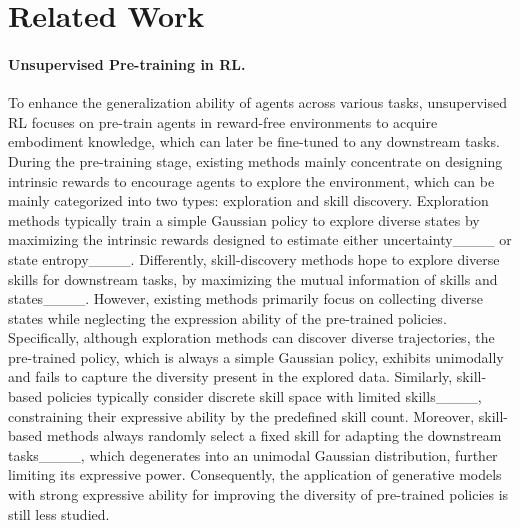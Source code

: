 \section{Related Work}
\paragraph{Unsupervised Pre-training in RL.} 
To enhance the generalization ability of agents across various tasks, unsupervised RL focuses on pre-train agents in reward-free environments to acquire embodiment knowledge, which can later be fine-tuned to any downstream tasks. 
During the pre-training stage, existing methods mainly concentrate on designing intrinsic rewards to encourage agents to explore the environment, which can be mainly categorized into two types: exploration and skill discovery. 
Exploration methods typically train a simple Gaussian policy to explore diverse states by maximizing the intrinsic rewards designed to estimate either uncertainty____ or state entropy____. 
Differently, skill-discovery methods hope to explore diverse skills for downstream tasks, by maximizing the mutual information of skills and states____. 
However, existing methods primarily focus on collecting diverse states while neglecting the expression ability of the pre-trained policies. Specifically, although exploration methods can discover diverse trajectories, the pre-trained policy, which is always a simple Gaussian policy, exhibits unimodally and fails to capture the diversity present in the explored data. 
Similarly, skill-based policies typically consider discrete skill space with limited skills____, constraining their expressive ability by the predefined skill count. Moreover, skill-based methods always randomly select a fixed skill for adapting the downstream tasks____, which degenerates into an unimodal Gaussian distribution, further limiting its expressive power. 
Consequently, the application of generative models with strong expressive ability for improving the diversity of pre-trained policies is still less studied.



